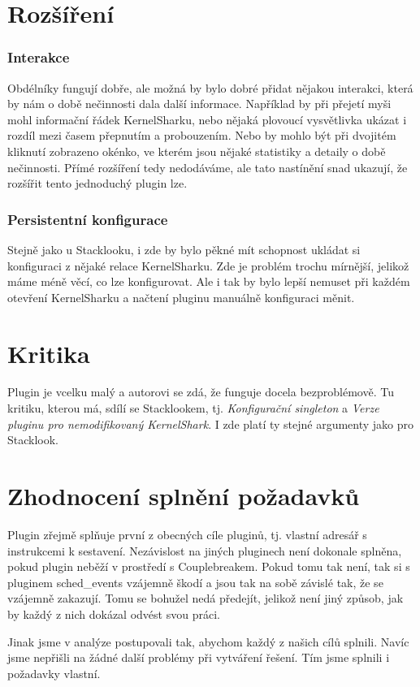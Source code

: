 \section{Rozšíření}
\subsubsection*{Interakce}
Obdélníky fungují dobře, ale možná by bylo dobré přidat nějakou interakci, která by nám o době nečinnosti dala další informace. Například by při přejetí myši mohl informační řádek KernelSharku, nebo nějaká plovoucí vysvětlivka ukázat i rozdíl mezi časem přepnutím a probouzením. Nebo by mohlo být při dvojitém kliknutí zobrazeno okénko, ve kterém jsou nějaké statistiky a detaily o době nečinnosti. Přímé rozšíření tedy nedodáváme, ale tato nastínění snad ukazují, že rozšířit tento jednoduchý plugin lze.

\subsubsection*{Persistentní konfigurace}
Stejně jako u Stacklooku, i zde by bylo pěkné mít schopnost ukládat si konfiguraci z nějaké relace KernelSharku. Zde je problém trochu mírnější, jelikož máme méně věcí, co lze konfigurovat. Ale i tak by bylo lepší nemuset při každém otevření KernelSharku a načtení pluginu manuálně konfiguraci měnit.

\section{Kritika}
Plugin je vcelku malý a autorovi se zdá, že funguje docela bezproblémově. Tu kritiku, kterou má, sdílí se Stacklookem, tj. \emph{Konfigurační singleton} a \emph{Verze pluginu pro nemodifikovaný KernelShark}. I zde platí ty stejné argumenty jako pro Stacklook.

\section{Zhodnocení splnění požadavků}
Plugin zřejmě splňuje první z obecných cíle pluginů, tj. vlastní adresář s instrukcemi k sestavení. Nezávislost na jiných pluginech není dokonale splněna, pokud plugin neběží v prostředí s Couplebreakem. Pokud tomu tak není, tak si s pluginem sched\_events vzájemně škodí a jsou tak na sobě závislé tak, že se vzájemně zakazují. Tomu se bohužel nedá předejít, jelikož není jiný způsob, jak by každý z nich dokázal odvést svou práci.

Jinak jsme v analýze postupovali tak, abychom každý z našich cílů splnili. Navíc jsme nepřišli na žádné další problémy při vytváření řešení. Tím jsme splnili i požadavky vlastní.